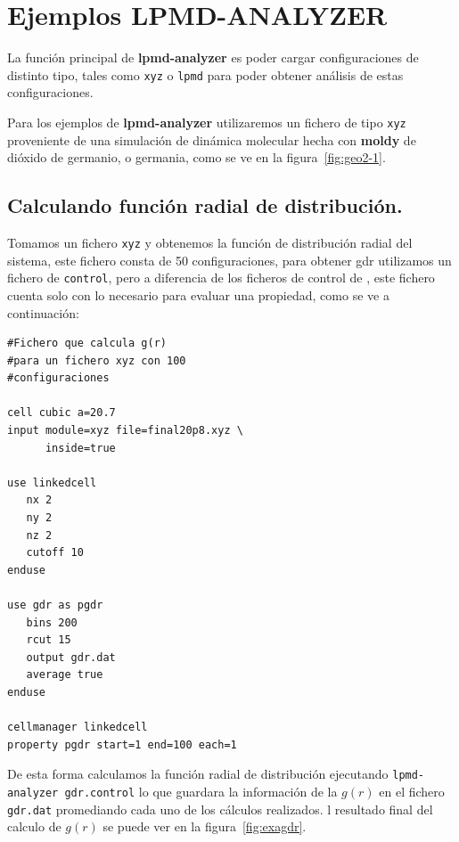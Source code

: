 \section{Ejemplos LPMD-ANALYZER}

La funci\'on principal de \textbf{lpmd-analyzer} es poder cargar configuraciones de distinto tipo, tales como \verb|xyz| o \verb|lpmd| para poder obtener an\'alisis de estas configuraciones.

Para los ejemplos de \textbf{lpmd-analyzer} utilizaremos un fichero de tipo \verb|xyz| proveniente de una simulaci\'on de din\'amica molecular hecha con \textbf{moldy} de di\'oxido de germanio, o germania, como se ve en la figura~\ref{fig:geo2-1}.


\subsection{Calculando funci\'on radial de distribuci\'on.}

Tomamos un fichero \verb|xyz| y obtenemos la funci\'on de distribuci\'on radial del sistema, este fichero consta de 50 configuraciones, para obtener gdr utilizamos un fichero de \verb|control|, pero a diferencia de los ficheros de control de {\lpmd}, este fichero cuenta solo con lo necesario para evaluar una propiedad, como se ve a continuaci\'on:

\begin{multicols}{2}
\setlength{\columnseprule}{.5pt}
\begin{verbatim}
#Fichero que calcula g(r)
#para un fichero xyz con 100 
#configuraciones

cell cubic a=20.7
input module=xyz file=final20p8.xyz \
      inside=true

use linkedcell
   nx 2
   ny 2
   nz 2
   cutoff 10
enduse

use gdr as pgdr
   bins 200
   rcut 15
   output gdr.dat
   average true
enduse

cellmanager linkedcell
property pgdr start=1 end=100 each=1
\end{verbatim}
\end{multicols}

De esta forma calculamos la funci\'on radial de distribuci\'on ejecutando \verb|lpmd-analyzer gdr.control| lo que guardara la informaci\'on de la $g(r)$ en el fichero \verb|gdr.dat| promediando cada uno de los c\'alculos realizados. l resultado final del calculo de $g(r)$ se puede ver en la figura~\ref{fig:exagdr}.

